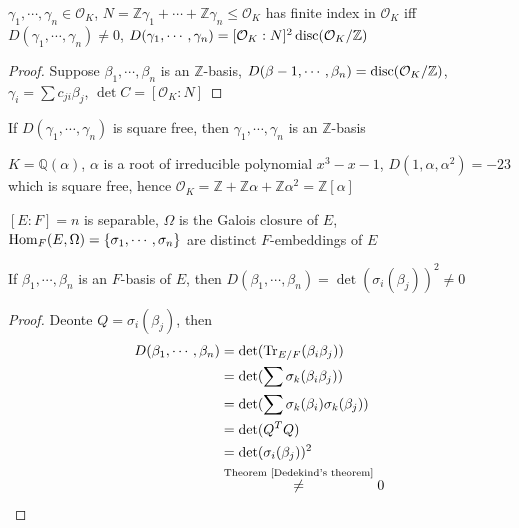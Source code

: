 \documentclass[main]{subfiles}
\begin{document}
\begin{proposition}
$\gamma_1,\cdots,\gamma_n\in\mathcal O_K$, $N=\mathbb Z\gamma_1+\cdots+\mathbb Z\gamma_n\leq\mathcal O_K$ has finite index in $\mathcal O_K$ iff $D(\gamma_1,\cdots,\gamma_n)\neq0$, $D(\gamma_1,\cdots,\gamma_n)=[\mathcal O_K:N]^2\operatorname{disc}(\mathcal O_K/\mathbb Z)$
\end{proposition}

\begin{proof}
Suppose $\beta_1,\cdots,\beta_n$ is an $\mathbb Z$-basis, $D(\beta-1,\cdots,\beta_n)=\operatorname{disc}(\mathcal O_K/\mathbb Z)$, $\gamma_i=\sum c_{ji}\beta_j$, $\det C=[\mathcal O_K:N]$
\end{proof}

\begin{proposition}
If $D(\gamma_1,\cdots,\gamma_n)$ is square free, then $\gamma_1,\cdots,\gamma_n$ is an $\mathbb Z$-basis
\end{proposition}

\begin{example}
$K=\mathbb Q(\alpha)$, $\alpha$ is a root of irreducible polynomial $x^3-x-1$, $D(1,\alpha,\alpha^2)=-23$ which is square free, hence $\mathcal O_K=\mathbb Z+\mathbb Z\alpha+\mathbb Z\alpha^2=\mathbb Z[\alpha]$
\end{example}

\begin{proposition}
$[E:F]=n$ is separable, $\Omega$ is the Galois closure of $E$, $\operatorname{Hom}_F(E,\Omega)=\{\sigma_1,\cdots,\sigma_n\}$ are distinct $F$-embeddings of $E$
\begin{center}
\end{center}
If $\beta_1,\cdots,\beta_n$ is an $F$-basis of $E$, then $D(\beta_1,\cdots,\beta_n)=\det(\sigma_i(\beta_j))^2\neq0$
\end{proposition}

\begin{proof}
Deonte $Q=\sigma_i(\beta_j)$, then
\begin{align*}
D(\beta_1,\cdots,\beta_n)&=\det(\operatorname{Tr}_{E/F}(\beta_i\beta_j)) \\
&=\det(\sum\sigma_k(\beta_i\beta_j)) \\
&=\det(\sum\sigma_k(\beta_i)\sigma_k(\beta_j)) \\
&=\det(Q^TQ) \\
&=\det(\sigma_i(\beta_j))^2 \\
&\overset{\text{Theorem \ref{Dedekind's theorem}}}{\neq}0
\end{align*}
\end{proof}
\end{document}
